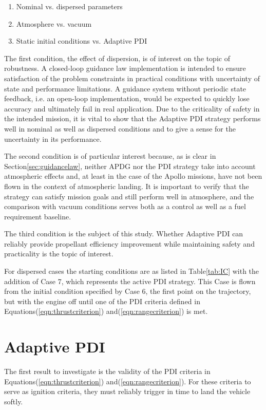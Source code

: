 \begin{enumerate}
	\item Nominal vs. dispersed parameters
	\item Atmosphere vs. vacuum
	\item Static initial conditions vs. Adaptive PDI
\end{enumerate}

The first condition, the effect of dispersion, is of interest on the topic of robustness. A closed-loop guidance law implementation is intended to ensure satisfaction of the problem constraints in practical conditions with uncertainty of state and performance limitations. A guidance system without periodic state feedback, i.e. an open-loop implementation, would be expected to quickly lose accuracy and ultimately fail in real application. Due to the criticality of safety in the intended mission, it is vital to show that the Adaptive PDI strategy performs well in nominal as well as dispersed conditions and to give a sense for the uncertainty in its performance.

The second condition is of particular interest because, as is clear in Section\:\ref{sec:guidancelaw}, neither APDG nor the PDI strategy take into account atmospheric effects and, at least in the case of the Apollo missions, have not been flown in the context of atmospheric landing. It is important to verify that the strategy can satisfy mission goals and still perform well in atmosphere, and the comparison with vacuum conditions serves both as a control as well as a fuel requirement baseline. 

The third condition is the subject of this study. Whether Adaptive PDI can reliably provide propellant efficiency improvement while maintaining safety and practicality is the topic of interest.

For dispersed cases the starting conditions are as listed in Table\:\ref{tab:IC} with the addition of Case 7, which represents the active PDI strategy. This Case is flown from the initial condition specified by Case 6, the first point on the trajectory, but with the engine off until one of the PDI criteria defined in Equations\:(\ref{eqn:thrustcriterion}) and\:(\ref{eqn:rangecriterion}) is met.

\pagebreak
\section{Adaptive PDI} \label{sec:PDIres}
The first result to investigate is the validity of the PDI criteria in Equations\:(\ref{eqn:thrustcriterion}) and\:(\ref{eqn:rangecriterion}). For these criteria to serve as ignition criteria, they must reliably trigger in time to land the vehicle softly.

